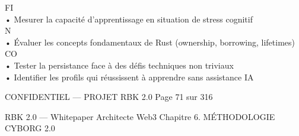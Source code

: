 \documentclass[12pt,landscape,a4paper]{article}
\newenvironment{confidential}
{\begin{tcolorbox}[
    colback=rbkred!5!white,
    colframe=rbkred!75!black,
    title=CONFIDENTIEL,
    fonttitle=\bfseries\color{white},
    coltitle=rbkred!75!black,
    breakable,
    enhanced,
    frame hidden,
    borderline west={2pt}{0pt}{rbkred!75!black}
]}
{\end{tcolorbox}}
\begin{document}
\vspace{0.5em}
\vspace{0.5em}
\vspace{0.5em}
\vspace{0.5em}
FI\\
• Mesurer la capacité d’apprentissage en situation de stress cognitif\\
\vspace{0.5em}
\vspace{0.5em}
\vspace{0.5em}
\vspace{0.5em}
N\\
• Évaluer les concepts fondamentaux de Rust (ownership, borrowing, lifetimes)\\
CO\\
• Tester la persistance face à des défis techniques non triviaux\\
• Identifier les profils qui réussissent à apprendre sans assistance IA\\
\vspace{0.5em}
\vspace{0.5em}
\vspace{0.5em}
\vspace{0.5em}
\begin{confidential}CONFIDENTIEL — PROJET RBK 2.0                                              Page 71 sur 316\end{confidential}
RBK 2.0 — Whitepaper Architecte Web3                                                                                 Chapitre 6. MÉTHODOLOGIE CYBORG 2.0\\
\vspace{0.5em}
\vspace{0.5em}
\end{document}
